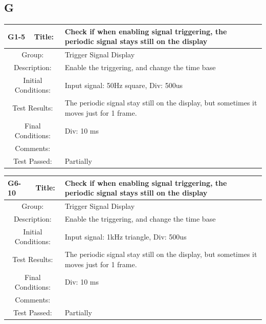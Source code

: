 \documentclass[12pt]{article}
\begin{document}
\subsection{G}
		\begin{table}[H]
	\begin{center}
		\begin{tabular}{| m{2cm}|m{2cm}|m{12cm}|}
			\hline 
			\bf G1-5&\bf Title:&\bf Check if when enabling signal triggering, the periodic signal stays still on the display\\ 
			\hline 
			\multicolumn{2}{|c|}{Group:}&Trigger Signal Display\\ 
			\hline 
			\multicolumn{2}{|c|}{Description:}&Enable the triggering, and change the time base\\ 
			\hline 
			\multicolumn{2}{|c|}{Initial Conditions:}&Input signal: 50Hz square, Div: 500us\\ 
			\hline 
			\multicolumn{2}{|c|}{Test Results:}&The periodic signal stay still on the display, but sometimes it moves just for 1 frame.\\ 
			\hline 
			\multicolumn{2}{|c|}{Final Conditions:}&Div: 10 ms\\ 
			\hline 
			\multicolumn{2}{|c|}{Comments:}&\\ 
			\hline 
			\multicolumn{2}{|c|}{Test Passed:}&Partially \\ 
			\hline 
		\end{tabular} 
	\end{center}
\end{table}	
		\begin{table}[H]
	\begin{center}
		\begin{tabular}{| m{2cm}|m{2cm}|m{12cm}|}
			\hline 
			\bf G6-10&\bf Title:&\bf Check if when enabling signal triggering, the periodic signal stays still on the display\\ 
			\hline 
			\multicolumn{2}{|c|}{Group:}&Trigger Signal Display\\ 
			\hline 
			\multicolumn{2}{|c|}{Description:}&Enable the triggering, and change the time base\\ 
			\hline 
			\multicolumn{2}{|c|}{Initial Conditions:}&Input signal: 1kHz triangle, Div: 500us\\ 
			\hline 
			\multicolumn{2}{|c|}{Test Results:}&The periodic signal stay still on the display, but sometimes it moves just for 1 frame.\\ 
			\hline 
			\multicolumn{2}{|c|}{Final Conditions:}&Div: 10 ms\\ 
			\hline 
			\multicolumn{2}{|c|}{Comments:}&\\ 
			\hline 
			\multicolumn{2}{|c|}{Test Passed:}&Partially \\ 
			\hline 
		\end{tabular} 
	\end{center}
\end{table}	
\end{document}
